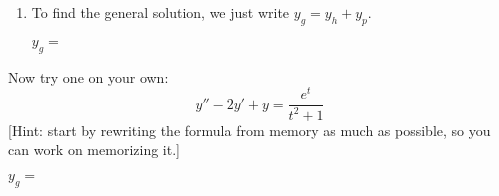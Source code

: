 \documentclass[12pt]{article}
\begin{document}
\begin{enumerate}
\begin{enumerate}
		\item To find the general solution, we just write $y_g=y_h+y_p$.
		\begin{flushright}
		$y_g=$ 
		\end{flushright}		
	\end{enumerate}
	\vspace*{36pt}
	
	\Problem Now try one on your own: 
	$$y''-2y'+y=\frac{e^t}{t^2+1}$$	
	[Hint: start by rewriting the formula from memory as much as possible, so you can work on memorizing it.]
	\begin{flushright}
	$y_g=$ \answerbox{18}
	\end{flushright}		
	\vfill
	
	\pagebreak
	\vfill
    

	
\end{enumerate}
\end{document}
